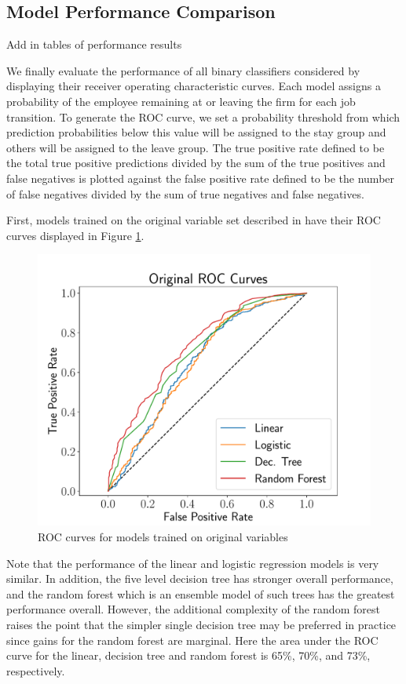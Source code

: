 \documentclass[10pt]{article}
\begin{document}
\subsection{Model Performance Comparison}
{\color{blue} Add in tables of performance results}

\hspace{\parindent}
We finally evaluate the performance of all binary classifiers considered by displaying their 
receiver operating characteristic curves.  Each model assigns a probability of the employee 
remaining at or leaving the firm for each job transition.  To generate the ROC curve, 
we set a probability threshold from which prediction probabilities below this value 
will be assigned to the stay group and others will be assigned to the leave group.  
The true positive rate defined to be the total true positive predictions divided 
by the sum of the true positives and false negatives is plotted against the 
false positive rate defined to be the number of false negatives divided by the 
sum of true negatives and false negatives.

First, models trained on the original variable set described in \cite{Smart2016} 
have their ROC curves displayed in Figure \ref{fig:orgroc}.
%
\begin{figure}[thb]
    \centering
	\includegraphics[width=1.0\linewidth]{oriROC.pdf}
	\caption{ROC curves for models trained on original variables}
	\label{fig:orgroc}
\end{figure}
%
Note that the performance of the linear and logistic regression models is very similar. 
In addition, the five level decision tree has stronger overall performance, and the 
random forest which is an ensemble model of such trees has the greatest performance overall.
However, the additional complexity of the random forest raises the point that the simpler 
single decision tree may be preferred in practice since gains for the random forest 
are marginal.  Here the area under the ROC curve for the linear, decision tree and random forest 
is 65\%, 70\%, and 73\%, respectively.  
\end{document}
